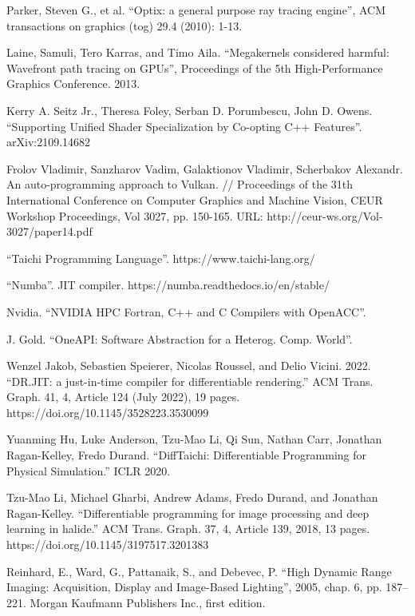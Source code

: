 \documentclass[11pt,fleqn,english,russian]{report} %
\begin{document}
\begin{thebibliography}{10}
	 Parker, Steven G., et al. ``Optix: a general purpose ray tracing engine'', ACM transactions on graphics (tog) 29.4 (2010): 1-13.
	
	 Laine, Samuli, Tero Karras, and Timo Aila. ``Megakernels considered harmful: Wavefront path tracing on GPUs'', Proceedings of the 5th High-Performance Graphics Conference. 2013.
	
	 Kerry A. Seitz Jr., Theresa Foley, Serban D. Porumbescu, John D. Owens. ``Supporting Unified Shader Specialization by Co-opting C++ Features''. arXiv:2109.14682 
	
	 Frolov Vladimir, Sanzharov Vadim, Galaktionov Vladimir, Scherbakov Alexandr. An auto-programming approach to Vulkan. // Proceedings of the 31th International Conference on Computer Graphics and Machine Vision, CEUR Workshop Proceedings, Vol 3027, pp. 150-165. URL: http://ceur-ws.org/Vol-3027/paper14.pdf 
	
	 ``Taichi Programming Language''. https://www.taichi-lang.org/
	
	 ``Numba''. JIT compiler. https://numba.readthedocs.io/en/stable/
	
	 Nvidia. ``NVIDIA HPC Fortran, C++ and C Compilers with OpenACC''.
	
	 J. Gold. ``OneAPI: Software Abstraction for a Heterog. Comp. World''. 
	
	 Wenzel Jakob, Sebastien Speierer, Nicolas Roussel, and Delio Vicini. 2022. ``DR.JIT: a just-in-time compiler for differentiable rendering.'' ACM Trans. Graph. 41, 4, Article 124 (July 2022), 19 pages. https://doi.org/10.1145/3528223.3530099
	
	 Yuanming Hu, Luke Anderson, Tzu-Mao Li, Qi Sun, Nathan Carr, Jonathan Ragan-Kelley, Fredo Durand. ``DiffTaichi: Differentiable Programming for Physical Simulation.'' ICLR 2020.
	
	 Tzu-Mao Li, Michael Gharbi, Andrew Adams, Fredo Durand, and Jonathan Ragan-Kelley. ``Differentiable programming for image processing and deep learning in halide.'' ACM Trans. Graph. 37, 4, Article 139, 2018, 13 pages. https://doi.org/10.1145/3197517.3201383
	
	 Reinhard, E., Ward, G., Pattanaik, S., and Debevec, P. ``High Dynamic Range Imaging: Acquisition, Display and Image-Based Lighting'', 2005, chap. 6, pp. 187–221. Morgan Kaufmann Publishers Inc., first edition.
	

\end{thebibliography}
\end{document}
